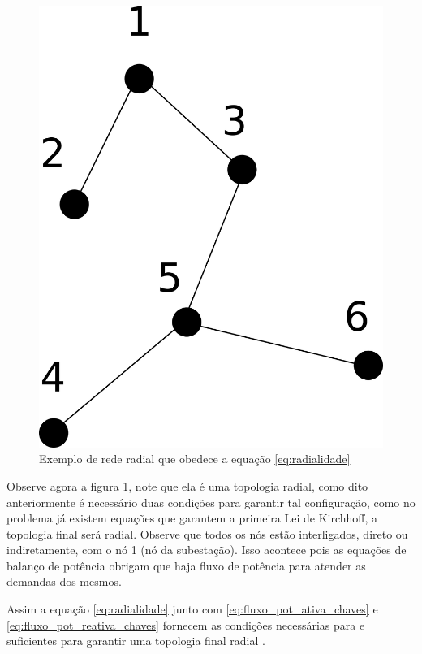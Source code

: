 \begin{figure}[H]
    \centering
    \includegraphics[scale=0.8]{01_img/restricao_radialidade.png}
    \caption{Exemplo de rede radial que obedece a equação \ref{eq:radialidade}}
    \label{fig:radialidade_right}
\end{figure}

Observe agora a figura \ref{fig:radialidade_right}, note que ela é uma topologia radial, como dito anteriormente é necessário duas condições para garantir tal configuração, como no problema já existem equações que garantem a primeira Lei de Kirchhoff, a topologia final será radial. 
Observe que todos os nós estão interligados, direto ou indiretamente, com o nó 1 (nó da subestação). 
Isso acontece pois as equações de balanço de potência obrigam que haja fluxo de potência para atender as demandas dos mesmos.

Assim a equação \ref{eq:radialidade} junto com \ref{eq:fluxo_pot_ativa_chaves} e \ref{eq:fluxo_pot_reativa_chaves} fornecem as condições necessárias para e suficientes para garantir uma topologia final radial \cite{Lavorato2012ImposingProblems}.

